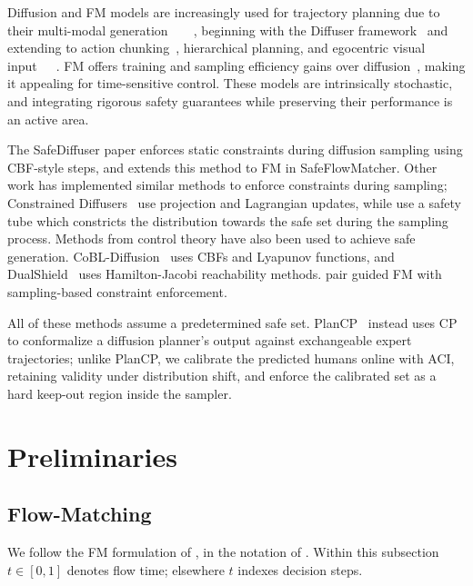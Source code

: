 \documentclass[letterpaper]{article} %
\begin{document}
Diffusion and FM models are increasingly used for trajectory planning due to their multi-modal generation~\cite{chi_diffusion_2023}~\cite{navDP_2025}~\cite{NoMaD_2024}~\cite{fan_diffusion_2025}, beginning with the Diffuser framework~\cite{janner_planning_2022} and extending to action chunking~\cite{chi_diffusion_2023}, hierarchical planning, and egocentric visual input~\cite{NoMaD_2024}~\cite{shah_vint_2023}~\cite{navDP_2025}. FM offers training and sampling efficiency gains over diffusion~\cite{lipman_flowmatching_2022}, making it appealing for time-sensitive control. These models are intrinsically stochastic, and integrating rigorous safety guarantees while preserving their performance is an active area.

The SafeDiffuser paper \cite{xiao_safediffuser_2023} enforces static constraints during diffusion sampling using CBF-style steps, and \citeauthor{yang_safeflowmatcher_2025} extends this method to FM in SafeFlowMatcher. Other work has implemented similar methods to enforce constraints during sampling; Constrained Diffusers~\cite{zhang_constrained_2026} use projection and Lagrangian updates, while \citeauthor{gadginmath_constricting-cbf_2026} use a safety tube which constricts the distribution towards the safe set during the sampling process. Methods from control theory have also been used to achieve safe generation. CoBL-Diffusion~\cite{mizuta_cobl-diffusion_2024} uses CBFs and Lyapunov functions, and DualShield~\cite{yang_dualshield_2026} uses Hamilton-Jacobi reachability methods. \citeauthor{mizuta_unified_2025} pair guided FM with sampling-based constraint enforcement.

All of these methods assume a predetermined safe set. PlanCP~\cite{planCP} instead uses CP to conformalize a diffusion planner's output against exchangeable expert trajectories; unlike PlanCP, we calibrate the predicted humans online with ACI, retaining validity under distribution shift, and enforce the calibrated set as a hard keep-out region inside the sampler.

\section{Preliminaries}
\subsection{Flow-Matching}

We follow the FM formulation of \citet{lipman_flowmatching_2022}, in the notation of \citet{yang_safeflowmatcher_2025}. Within this subsection \(t \in [0,1]\) denotes flow time; elsewhere \(t\) indexes decision steps.
\end{document}
